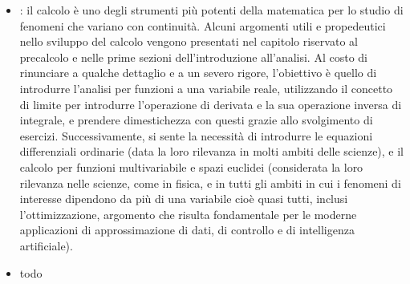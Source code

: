 \documentclass[letterpaper,10pt,italian]{jupyterBook}
\begin{document}
\begin{itemize}
\item {} 
\sphinxAtStartPar
{}: il calcolo è uno degli strumenti più potenti della matematica per lo studio di fenomeni che variano con continuità. Alcuni argomenti utili e propedeutici nello sviluppo del calcolo vengono presentati nel capitolo riservato al precalcolo e nelle prime sezioni dell’introduzione all’analisi. Al costo di rinunciare a qualche dettaglio e a un severo rigore, l’obiettivo è quello di introdurre l’analisi per funzioni a una variabile reale, utilizzando il concetto di limite per introdurre l’operazione di derivata e la sua operazione inversa di integrale, e prendere dimestichezza con questi grazie allo svolgimento di esercizi. Successivamente, si sente la necessità di introdurre le equazioni differenziali ordinarie (data la loro rilevanza in molti ambiti delle scienze), e il calcolo per funzioni multi\sphinxhyphen{}variabile e spazi euclidei (considerata la loro rilevanza nelle scienze, come in fisica, e in tutti gli ambiti in cui i fenomeni di interesse dipendono da più di una variabile \sphinxhyphen{} cioè quasi tutti, inclusi l’ottimizzazione, argomento che risulta fondamentale per le moderne applicazioni di approssimazione di dati, di controllo e di intelligenza artificiale).

\item {} 
\sphinxAtStartPar
{} todo

\end{itemize}
\end{document}
